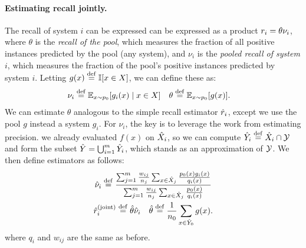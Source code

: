 \paragraph{Estimating recall jointly.}
The recall of system $i$ can be expressed can be expressed as a product $r_i = \theta \nu_i$,
where $\theta$ is the \emph{recall of the pool}, which measures the fraction of all positive instances predicted by the pool (any system),
and $\nu_i$ is the \emph{pooled recall of system $i$}, which measures the fraction of the pool's positive instances predicted by system $i$.
Letting $g(x) \stackrel{\rm def}{=} \mathbb{I}[x \in X]$, we can define these as:
\begin{align*}
\nu_i &\stackrel{\rm def}{=} \mathbb{E}_{x \sim p_0}[g_i(x) \mid x \in X] & \theta &\stackrel{\rm def}{=} \mathbb{E}_{x \sim p_0}[g(x)].
\end{align*}
We can estimate $\theta$ analogous to the simple recall estimator ${\hat{r}}_i$,
except we use the pool $g$ instead a system $g_i$.
For $\nu_i$, the key is to leverage the work from estimating precision.
we already evaluated $f(x)$ on ${\hat{X}}_i$, so we can compute ${\hat{Y}}_i \stackrel{\rm def}{=} {\hat{X}}_i \cap \mathcal{Y}$
and form the subset ${\hat{Y}} = \bigcup_{i=1}^m {\hat{Y}}_i$,
which stands as an approximation of $\mathcal{Y}$.
We then define estimators as follows:
\begin{gather*}
  {\hat{\nu}}_i \stackrel{\rm def}{=} \frac{\sum_{j=1}^m \frac{w_{ij}}{n_j} \sum_{x \in {\hat{X}}_j} \frac{p_0(x) g_i(x)}{q_i(x)}}{\sum_{j=1}^m \frac{w_{ij}}{n_j} \sum_{x \in {\hat{X}}_j} \frac{p_0(x)}{q_i(x)}} \\
  {\hat{r}}_i^{\text{(joint)}} \stackrel{\rm def}{=} {\hat{\theta}}{\hat{\nu}}_i \quad {\hat{\theta}} \stackrel{\rm def}{=} \frac{1}{n_0} \sum_{x \in {\hat{Y}}_0} g(x).
\end{gather*}
where $q_i$ and $w_{ij}$ are the same as before.


